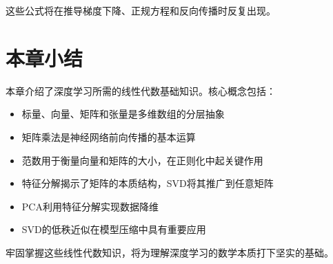 这些公式将在推导梯度下降、正规方程和反向传播时反复出现。

\section{本章小结}

本章介绍了深度学习所需的线性代数基础知识。核心概念包括：
\begin{itemize}
    \item 标量、向量、矩阵和张量是多维数组的分层抽象
    \item 矩阵乘法是神经网络前向传播的基本运算
    \item 范数用于衡量向量和矩阵的大小，在正则化中起关键作用
    \item 特征分解揭示了矩阵的本质结构，SVD将其推广到任意矩阵
    \item PCA利用特征分解实现数据降维
    \item SVD的低秩近似在模型压缩中具有重要应用
\end{itemize}

牢固掌握这些线性代数知识，将为理解深度学习的数学本质打下坚实的基础。
